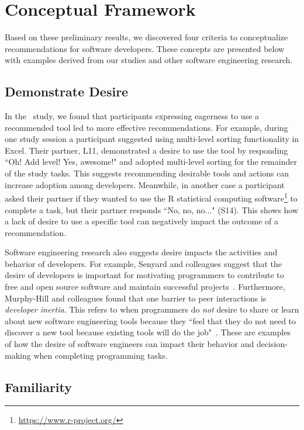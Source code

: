 \section{Conceptual Framework}

Based on these preliminary results, we discovered four criteria to conceptualize recommendations for software developers. These concepts are presented below with examples derived from our studies and other software engineering research.

\subsection{Demonstrate Desire}

In the \peer~study, we found that participants expressing  eagerness  to  use  a  recommended  tool led to more effective recommendations.  For example, during one study session a participant suggested using multi-level sorting functionality in Excel. Their partner, L11, demonstrated a desire to use the tool by  responding ``Oh!  Add  level!  Yes, awesome!" and adopted multi-level sorting for the remainder of the study tasks. This suggests recommending desirable tools and actions can increase adoption among developers. Meanwhile, in another case a participant asked their partner if they wanted to use the R statistical computing software\footnote{\url{https://www.r-project.org/}} to complete a task, but their partner responds ``No, no, no..." (S14). This shows how a lack of desire to use a specific tool can negatively impact the outcome of a recommendation. 

Software engineering research also suggests desire impacts the activities and behavior of developers. For example, Senyard and colleagues suggest that the desire of developers is important for motivating programmers to contribute to free and open source software and maintain successful projects~\cite{senyard2004have}. Furthermore, Murphy-Hill and colleagues found that one barrier to peer interactions is \textit{developer inertia}. This refers to when programmers do \textit{not} desire to share or learn about new software engineering tools because they ``feel that they do not need to discover a new tool because existing tools will do the job"~\cite[p.~16]{Murphy-Hill2015HowDoUsers}. These are examples of how the desire of software engineers can impact their behavior and decision-making when completing programming tasks.

\subsection{Familiarity}

